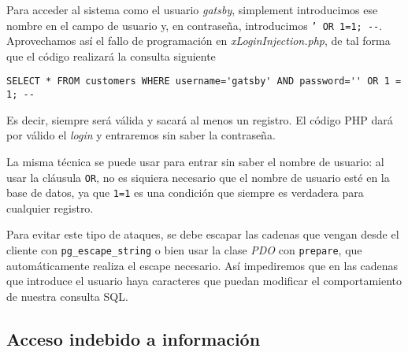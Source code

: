 \documentclass{article}
\begin{document}
Para acceder al sistema como el usuario \textit{gatsby}, simplement introducimos ese nombre en el campo de usuario y, en contraseña, introducimos \texttt{' OR 1=1; {-}-}. Aprovechamos así el fallo de programación en \textit{xLoginInjection.php}, de tal forma que el código realizará la consulta siguiente

\begin{Verbatim}[frame = lines]
SELECT * FROM customers WHERE username='gatsby' AND password='' OR 1 = 1; --
\end{Verbatim}

Es decir, siempre será válida y sacará al menos un registro. El código PHP dará por válido el \textit{login} y entraremos sin saber la contraseña.

La misma técnica se puede usar para entrar sin saber el nombre de usuario: al usar la cláusula \texttt{OR}, no es siquiera necesario que el nombre de usuario esté en la base de datos, ya que \texttt{1=1} es una condición que siempre es verdadera para cualquier registro.

Para evitar este tipo de ataques, se debe escapar las cadenas que vengan desde el cliente con \texttt{pg\_escape\_string} o bien usar la clase \textit{PDO} con \texttt{prepare}, que automáticamente realiza el escape necesario. Así impediremos que en las cadenas que introduce el usuario haya caracteres que puedan modificar el comportamiento de nuestra consulta SQL.

\subsection{Acceso indebido a información}
\end{document}
